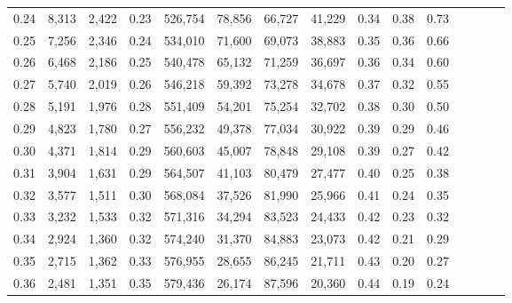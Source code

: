 \begin{tabular}{rrrcrrrrrrrrrrr}
0.24 &   8,313 &  2,422 &                                       0.23 &  526,754 &   78,856 &   66,727 &   41,229 &  0.34 &  0.38 &                         0.73 \\
0.25 &   7,256 &  2,346 &                                       0.24 &  534,010 &   71,600 &   69,073 &   38,883 &  0.35 &  0.36 &                         0.66 \\
0.26 &   6,468 &  2,186 &                                       0.25 &  540,478 &   65,132 &   71,259 &   36,697 &  0.36 &  0.34 &                         0.60 \\
0.27 &   5,740 &  2,019 &                                       0.26 &  546,218 &   59,392 &   73,278 &   34,678 &  0.37 &  0.32 &                         0.55 \\
0.28 &   5,191 &  1,976 &                                       0.28 &  551,409 &   54,201 &   75,254 &   32,702 &  0.38 &  0.30 &                         0.50 \\
0.29 &   4,823 &  1,780 &                                       0.27 &  556,232 &   49,378 &   77,034 &   30,922 &  0.39 &  0.29 &                         0.46 \\
0.30 &   4,371 &  1,814 &                                       0.29 &  560,603 &   45,007 &   78,848 &   29,108 &  0.39 &  0.27 &                         0.42 \\
0.31 &   3,904 &  1,631 &                                       0.29 &  564,507 &   41,103 &   80,479 &   27,477 &  0.40 &  0.25 &                         0.38 \\
0.32 &   3,577 &  1,511 &                                       0.30 &  568,084 &   37,526 &   81,990 &   25,966 &  0.41 &  0.24 &                         0.35 \\
0.33 &   3,232 &  1,533 &                                       0.32 &  571,316 &   34,294 &   83,523 &   24,433 &  0.42 &  0.23 &                         0.32 \\
0.34 &   2,924 &  1,360 &                                       0.32 &  574,240 &   31,370 &   84,883 &   23,073 &  0.42 &  0.21 &                         0.29 \\
0.35 &   2,715 &  1,362 &                                       0.33 &  576,955 &   28,655 &   86,245 &   21,711 &  0.43 &  0.20 &                         0.27 \\
0.36 &   2,481 &  1,351 &                                       0.35 &  579,436 &   26,174 &   87,596 &   20,360 &  0.44 &  0.19 &                         0.24 \\

\end{tabular}
